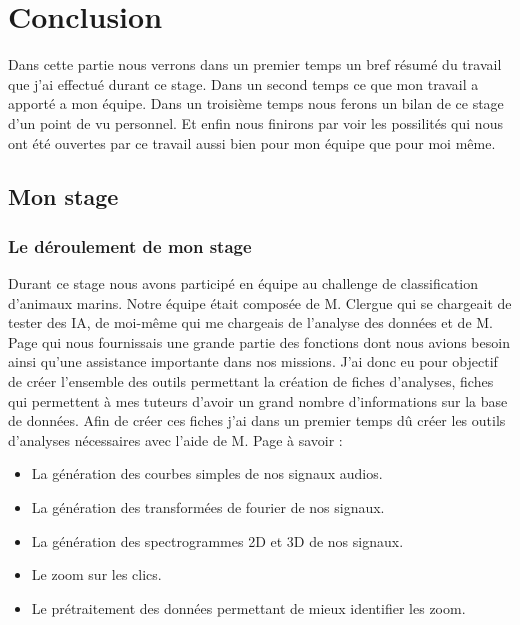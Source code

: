 \hypertarget{conclusion}{%
\chapter{Conclusion}\label{conclusion}}

Dans cette partie nous verrons dans un premier temps un bref résumé du travail que j'ai effectué durant ce stage. Dans un second temps ce que mon travail a apporté a mon équipe. Dans un troisième temps nous ferons un bilan de ce stage d'un point de vu personnel. Et enfin nous finirons par voir les possilités qui nous ont été ouvertes par ce travail aussi bien pour mon équipe que pour moi même.

\section{Mon stage}

\subsection{Le déroulement de mon stage}

Durant ce stage nous avons participé en équipe au challenge de classification d'animaux marins. Notre équipe était composée de M. Clergue qui se chargeait de tester des IA, de moi-même qui me chargeais de l'analyse des données et de M. Page qui nous fournissais une grande partie des fonctions dont nous avions besoin ainsi qu'une assistance importante dans nos missions.
J'ai donc eu pour objectif de créer l'ensemble des outils permettant la création de fiches d'analyses, fiches qui permettent à mes tuteurs d'avoir un grand nombre d'informations sur la base de données.
Afin de créer ces fiches j'ai dans un premier temps dû créer les outils d'analyses nécessaires avec l'aide de M. Page à savoir :

\begin{itemize}

\item La génération des courbes simples de nos signaux audios.
\item La génération des transformées de fourier de nos signaux.
\item La génération des spectrogrammes 2D et 3D de nos signaux.
\item Le zoom sur les clics.
\item Le prétraitement des données permettant de mieux identifier les zoom.

\end{itemize}

